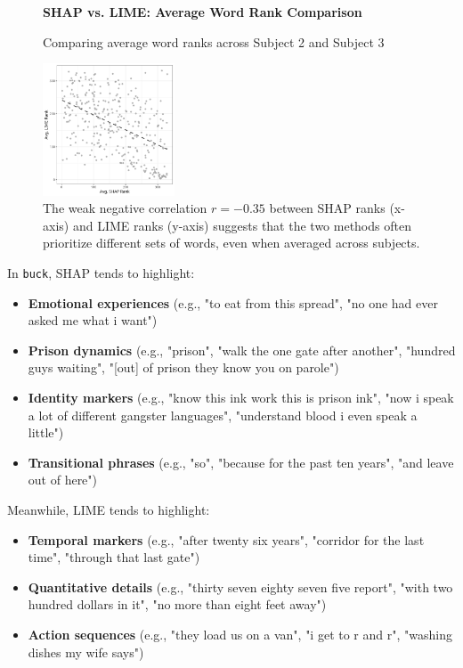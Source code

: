 \documentclass[10pt,letterpaper]{article}
\begin{document}
\begin{figure}[ht]
    \centering

    \parbox{\textwidth}{\centering 
        \fontsize{13pt}{13pt}\selectfont \textbf{SHAP vs. LIME: Average Word Rank Comparison}  
        
        {\fontsize{11pt}{13pt}\selectfont Comparing average word ranks across Subject 2 and Subject 3} 
    }
  
    \includegraphics[width=0.35\textwidth]{figs/scatter_buck_rank.png}
    
    \caption{The weak negative correlation $r = -0.35$ between SHAP ranks (x-axis) and LIME ranks (y-axis) suggests that the two methods often prioritize different sets of words, even when averaged across subjects.}
    \label{fig:scatter_buck_2}
\end{figure}


In \texttt{buck}, SHAP tends to highlight:
\begin{itemize}
	\item \textbf{Emotional experiences} (e.g., "to eat from this spread", "no one had ever asked me what i want")
	\item \textbf{Prison dynamics} (e.g., "prison", "walk the one gate after another", "hundred guys waiting", "[out] of prison they know you on parole")
	\item \textbf{Identity markers} (e.g., "know this ink work this is prison ink", "now i speak a lot of different gangster languages", "understand blood i even speak a little")
	\item \textbf{Transitional phrases} (e.g., "so", "because for the past ten years", "and leave out of here")
\end{itemize}


Meanwhile, LIME tends to highlight:
\begin{itemize}
	\item \textbf{Temporal markers} (e.g., "after twenty six years", "corridor for the last time", "through that last gate")
	\item \textbf{Quantitative details} (e.g., "thirty seven eighty seven five report", "with two hundred dollars in it", "no more than eight feet away")
	\item \textbf{Action sequences} (e.g., "they load us on a van", "i get to r and r", "washing dishes my wife says")
\end{itemize}
\end{document}

